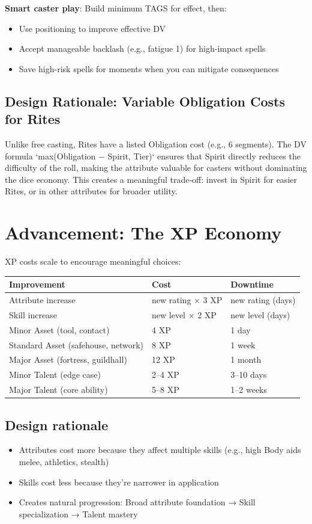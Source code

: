 \documentclass[11pt]{article}
\begin{document}
\textbf{Smart caster play}: Build minimum TAGS for effect, then:
\begin{itemize}
    \item Use positioning to improve effective DV
    \item Accept manageable backlash (e.g., fatigue 1) for high-impact spells
    \item Save high-risk spells for moments when you can mitigate consequences
\end{itemize}

\subsection{Design Rationale: Variable Obligation Costs for Rites}
Unlike free casting, Rites have a listed Obligation cost (e.g., 6 segments). The DV formula `max(Obligation − Spirit, Tier)` ensures that Spirit directly reduces the difficulty of the roll, making the attribute valuable for casters without dominating the dice economy. This creates a meaningful trade‑off: invest in Spirit for easier Rites, or in other attributes for broader utility.

\section{Advancement: The XP Economy}

XP costs scale to encourage meaningful choices:

\begin{table}[h]
\centering
\begin{tabular}{lll}
\toprule
\textbf{Improvement} & \textbf{Cost} & \textbf{Downtime} \\
\midrule
Attribute increase & new rating × 3 XP & new rating (days) \\
Skill increase & new level × 2 XP & new level (days) \\
Minor Asset (tool, contact) & 4 XP & 1 day \\
Standard Asset (safehouse, network) & 8 XP & 1 week \\
Major Asset (fortress, guildhall) & 12 XP & 1 month \\
Minor Talent (edge case) & 2–4 XP & 3–10 days \\
Major Talent (core ability) & 5–8 XP & 1–2 weeks \\
\bottomrule
\end{tabular}
\end{table}

\subsection{Design rationale}
\begin{itemize}
    \item Attributes cost more because they affect multiple skills (e.g., high Body aids melee, athletics, stealth)
    \item Skills cost less because they're narrower in application
    \item Creates natural progression: Broad attribute foundation → Skill specialization → Talent mastery
\end{itemize}
\end{document}
